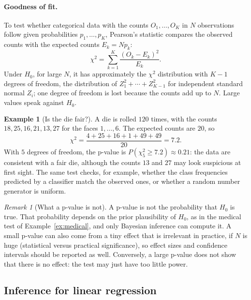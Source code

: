 \documentclass[11pt]{article}
\theoremstyle{definition}
\newtheorem{example}[definition]{Example}
\theoremstyle{plain}
\theoremstyle{remark}
\newtheorem{remark}[definition]{Remark}
\begin{document}
\paragraph{Goodness of fit.} To test whether categorical data with the counts $O_1, \ldots, O_K$ in $N$ observations follow given probabilities $p_1, \ldots, p_K$, Pearson's statistic compares the observed counts with the expected counts $E_k = Np_k$:
\[\chi^2 = \sum_{k=1}^K \frac{(O_k - E_k)^2}{E_k}.\]
Under $H_0$, for large $N$, it has approximately the $\chi^2$ distribution with $K - 1$ degrees of freedom, the distribution of $Z_1^2 + \cdots + Z_{K-1}^2$ for independent standard normal $Z_i$; one degree of freedom is lost because the counts add up to $N$. Large values speak against $H_0$.

\begin{example}[Is the die fair?]\label{ex:chi-square}
    A die is rolled $120$ times, with the counts $18, 25, 16, 21, 13, 27$ for the faces $1, \ldots, 6$. The expected counts are $20$, so
    \[\chi^2 = \frac{4 + 25 + 16 + 1 + 49 + 49}{20} = 7.2.\]
    With $5$ degrees of freedom, the p-value is $P(\chi^2_5 \geq 7.2) \approx 0.21$: the data are consistent with a fair die, although the counts $13$ and $27$ may look suspicious at first sight. The same test checks, for example, whether the class frequencies predicted by a classifier match the observed ones, or whether a random number generator is uniform.
\end{example}

\begin{remark}[What a p-value is not]
    A p-value is not the probability that $H_0$ is true. That probability depends on the prior plausibility of $H_0$, as in the medical test of Example~\ref{ex:medical}, and only Bayesian inference can compute it. A small p-value can also come from a tiny effect that is irrelevant in practice, if $N$ is huge (statistical versus practical significance), so effect sizes and confidence intervals should be reported as well. Conversely, a large p-value does not show that there is no effect: the test may just have too little power.
\end{remark}

\subsection{Inference for linear regression}\label{sec:regression-inference}
\end{document}
